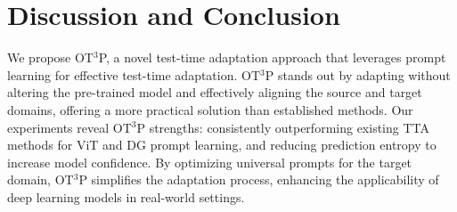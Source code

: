 \documentclass[11pt,a4paper]{article}
\begin{document}
\section{Discussion and Conclusion}

We propose OT$^3$P, a novel test-time adaptation approach that leverages prompt learning for effective test-time adaptation. 
OT$^3$P stands out by adapting without altering the pre-trained model and effectively aligning the source and target domains, offering a more practical solution than established methods. 
Our experiments reveal OT$^3$P strengths: consistently outperforming existing TTA methods for ViT and DG prompt learning, and reducing prediction entropy to increase model confidence. By optimizing universal prompts for the target domain, OT$^3$P simplifies the adaptation process, enhancing the applicability of deep learning models in real-world settings.



\clearpage
\newpage



\end{document}
